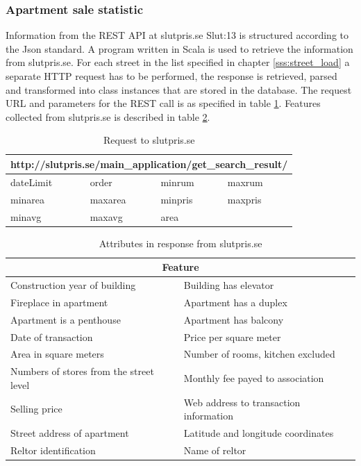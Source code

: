 \subsubsection{Apartment sale statistic} \label{sss:slutpris} %
Information from the REST API at slutpris.se \cite{dat}{Slut:13} is structured according to the Json standard. A program written in Scala is used to retrieve the information from slutpris.se. For each street in the list specified in chapter \ref{sss:street_load} a separate HTTP request has to be performed, the response is retrieved, parsed and transformed into class instances that are stored in the database. The request URL and parameters for the REST call is as specified in table \ref{tab:slutpris_se}. Features collected from slutpris.se is described in table \ref{tab:slutpris_se_result}. 

\begin{table}[H]
\centering
\begin{tabular}{ |p{2cm}|p{2cm}|p{2cm}|p{2cm}| } 
\hline
\multicolumn{4}{|c|}{http://slutpris.se/main\_application/get\_search\_result/} \\
\hline
dateLimit & order & minrum & maxrum \\
minarea & maxarea & minpris & maxpris \\
minavg & maxavg & area &  \\
\hline
\end{tabular}
\caption{Request to slutpris.se}
\label{tab:slutpris_se}
\end{table}


\begin{table}[H]
\begin{tabular}{ | p{6cm} | p{6cm} | } 
\hline 
\multicolumn{2}{|c|}{Feature} \\
\hline
Construction year of building & Building has elevator \\
Fireplace in apartment & Apartment has a duplex \\
Apartment is a penthouse & Apartment has balcony \\
Date of transaction & Price per square meter \\
Area in square meters & Number of rooms, kitchen excluded \\
Numbers of stores from the street level & Monthly fee payed to association \\
Selling price & Web address to transaction information \\
Street address of apartment & Latitude and longitude coordinates \\
Reltor identification & Name of reltor \\
\hline
\end{tabular}
\caption{Attributes in response from slutpris.se}
\label{tab:slutpris_se_result}
\end{table}

